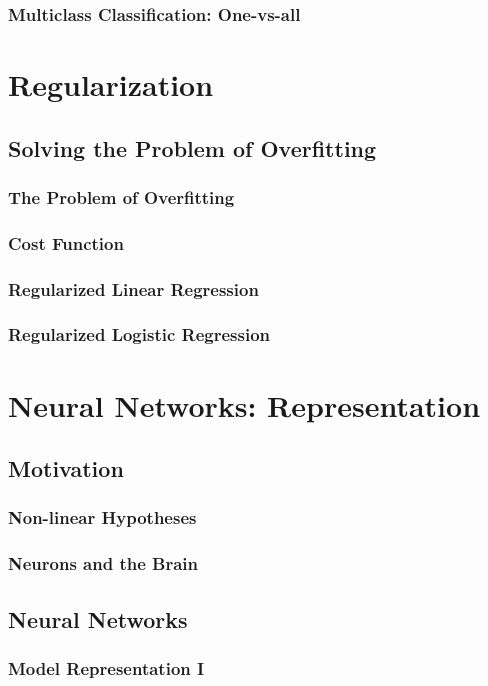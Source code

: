\documentclass{article}
\begin{document}
\subsubsection{Multiclass Classification: One-vs-all}

\newpage

\section{Regularization}
\subsection{Solving the Problem of Overfitting}
\subsubsection{The Problem of Overfitting}
\subsubsection{Cost Function}
\subsubsection{Regularized Linear Regression}
\subsubsection{Regularized Logistic Regression}

\section{Neural Networks: Representation}
\subsection{Motivation}
\subsubsection{Non-linear Hypotheses}
\subsubsection{Neurons and the Brain}
\subsection{Neural Networks}
\subsubsection{Model Representation I}
\end{document}
